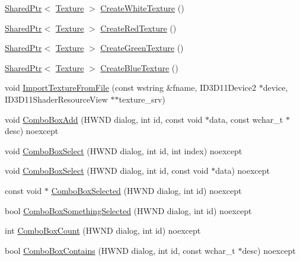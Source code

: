 \begin{DoxyCompactItemize}
\hyperlink{namespacemage_a1e01ae66713838a7a67d30e44c67703e}{Shared\+Ptr}$<$ \hyperlink{classmage_1_1_texture}{Texture} $>$ \hyperlink{namespacemage_ac3a2a10cbfc0346662a6fb40dcd0c400}{Create\+White\+Texture} ()
\item 
\hyperlink{namespacemage_a1e01ae66713838a7a67d30e44c67703e}{Shared\+Ptr}$<$ \hyperlink{classmage_1_1_texture}{Texture} $>$ \hyperlink{namespacemage_adf1d25e4497d1d0305d5bd755bc6860e}{Create\+Red\+Texture} ()
\item 
\hyperlink{namespacemage_a1e01ae66713838a7a67d30e44c67703e}{Shared\+Ptr}$<$ \hyperlink{classmage_1_1_texture}{Texture} $>$ \hyperlink{namespacemage_a8c19d68e546997b7ef5951ad732cd7ff}{Create\+Green\+Texture} ()
\item 
\hyperlink{namespacemage_a1e01ae66713838a7a67d30e44c67703e}{Shared\+Ptr}$<$ \hyperlink{classmage_1_1_texture}{Texture} $>$ \hyperlink{namespacemage_ae09e6160c64eba1b750bf947338dadf1}{Create\+Blue\+Texture} ()
\item 
void \hyperlink{namespacemage_a9bb74ea4a8a931490230fcef651cbd24}{Import\+Texture\+From\+File} (const wstring \&fname, I\+D3\+D11\+Device2 $\ast$device, I\+D3\+D11\+Shader\+Resource\+View $\ast$$\ast$texture\+\_\+srv)
\item 
void \hyperlink{namespacemage_ad57dc63e7d86e7e1ddad0163e78364b6}{Combo\+Box\+Add} (H\+W\+ND dialog, int id, const void $\ast$data, const wchar\+\_\+t $\ast$desc) noexcept
\item 
void \hyperlink{namespacemage_a14dde097b9bad361359a4281bcf9ade3}{Combo\+Box\+Select} (H\+W\+ND dialog, int id, int index) noexcept
\item 
void \hyperlink{namespacemage_a71cfdbfc9229b17e22dea0140deac539}{Combo\+Box\+Select} (H\+W\+ND dialog, int id, const void $\ast$data) noexcept
\item 
const void $\ast$ \hyperlink{namespacemage_a7d54d1b2ee6013d59e3d76adf065b9c0}{Combo\+Box\+Selected} (H\+W\+ND dialog, int id) noexcept
\item 
bool \hyperlink{namespacemage_a881979e0618d9614e6217076b4d243ba}{Combo\+Box\+Something\+Selected} (H\+W\+ND dialog, int id) noexcept
\item 
int \hyperlink{namespacemage_adb2bca66eb08ea32a3a9f825f154c766}{Combo\+Box\+Count} (H\+W\+ND dialog, int id) noexcept
\item 
bool \hyperlink{namespacemage_ad9eb627224ebc43c0a97ee506a276ea6}{Combo\+Box\+Contains} (H\+W\+ND dialog, int id, const wchar\+\_\+t $\ast$desc) noexcept
\item 
$$
\end{DoxyCompactItemize}
